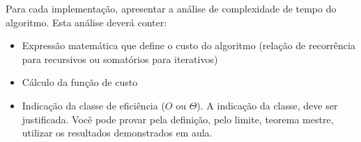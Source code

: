 \documentclass{article}
\begin{document}
Para cada implementação, apresentar a análise de complexidade de tempo do algoritmo. Esta análise deverá conter:

\begin{itemize}
    \item Expressão matemática que define o custo do algoritmo (relação de recorrência para recursivos ou somatórios para iterativos) 
    \item Cálculo da função de custo
    \item Indicação da classe de eficiência ($O$ ou $\Theta$). A indicação da classe, deve ser justificada. Você pode provar pela definição, pelo limite, teorema mestre, utilizar os resultados demonstrados em aula.
\end{itemize}


%
%
\end{document}
